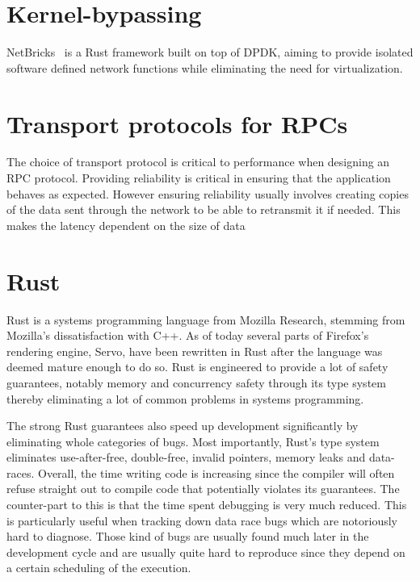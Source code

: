 \section{Kernel-bypassing}

NetBricks~\cite{netbricks} is a Rust framework built on top of DPDK,
aiming to provide isolated software defined network functions while
eliminating the need for virtualization.

\section{Transport protocols for RPCs}

The choice of transport protocol is critical to performance when
designing an RPC protocol. Providing reliability is critical in
ensuring that the application behaves as expected. However ensuring
reliability usually involves creating copies of the data sent through
the network to be able to retransmit it if needed. This makes the
latency dependent on the size of data


\section{Rust}

Rust is a systems programming language from Mozilla Research, stemming
from Mozilla's dissatisfaction with C++. As of today several parts of
Firefox's rendering engine, Servo, have been rewritten in Rust after
the language was deemed mature enough to do so. Rust is engineered to
provide a lot of safety guarantees, notably memory and concurrency
safety through its type system thereby eliminating a lot of common
problems in systems programming.

The strong Rust guarantees also speed up development significantly by
eliminating whole categories of bugs. Most importantly, Rust's type system
eliminates use-after-free, double-free, invalid pointers, memory leaks
and data-races. Overall, the time writing code is increasing since the
compiler will often refuse straight out to compile code that
potentially violates its guarantees. The counter-part to this is that
the time spent debugging is very much reduced. This is particularly
useful when tracking down data race bugs which are notoriously hard to
diagnose. Those kind of bugs are usually found much later in the
development cycle and are usually quite hard to reproduce since they
depend on a certain scheduling of the execution.

